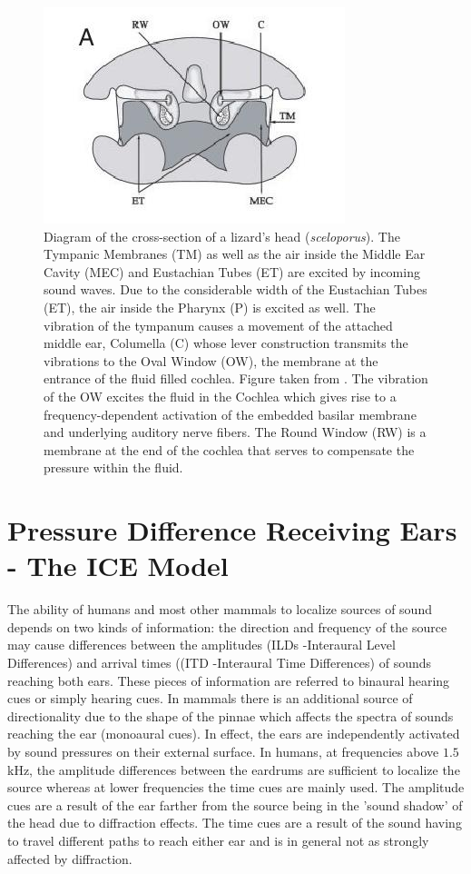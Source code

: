 \begin{figure}[ht!]
 \centering
 \includegraphics[width=0.45\linewidth]{Diagrams/lizardheadcrosssection.jpeg}
 \caption[Cross Section of a Lizards Head]{Diagram of the cross-section of a lizard’s head (\emph{sceloporus}). The Tympanic Membranes (TM) as well as
 the air inside the Middle Ear Cavity (MEC) and Eustachian Tubes (ET) are excited by incoming sound waves. Due to the considerable width of the Eustachian Tubes (ET), the air inside the Pharynx (P) is excited as well.
 The vibration of the tympanum causes a movement of the attached middle ear, Columella (C) whose lever construction transmits the vibrations to the Oval Window (OW), the membrane at the entrance of the fluid filled cochlea.
 Figure taken from \cite{dalsgaardmanley1}. The vibration of the OW excites the fluid in the Cochlea which gives rise to a frequency-dependent activation of the embedded basilar membrane and underlying
 auditory nerve fibers. The Round Window (RW) is a membrane at the end of the cochlea that serves to compensate the pressure within the fluid.}
 \label{lizardheadcrosssection}
\end{figure}

\section{Pressure Difference Receiving Ears - The ICE Model}\label{iceintrosection}
The ability of humans and most other mammals to localize sources of sound depends on two kinds of information: the direction and frequency
of the source may cause differences between the amplitudes (ILDs -Interaural Level Differences) and arrival times ((ITD -Interaural Time Differences) of sounds reaching both ears. These pieces of information are
referred to binaural hearing cues or simply hearing cues. In mammals there is an additional source of directionality due to the shape
of the pinnae which affects the spectra of sounds reaching the ear (monoaural cues). In effect, the ears are independently activated by sound pressures
on their external surface. In humans, at frequencies above $1.5$kHz, the amplitude differences between the eardrums are sufficient
to localize the source whereas at lower frequencies the time cues are mainly used. The amplitude cues are a result of the ear farther
from the source being in the 'sound shadow' of the head due to diffraction effects. The time cues are a result of the sound having to travel
different paths to reach either ear and is in general not as strongly affected by diffraction.

